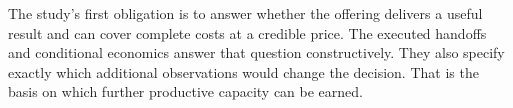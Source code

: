 The study's first obligation is to answer whether the offering delivers a useful result and can cover complete costs at a credible price. The executed handoffs and conditional economics answer that question constructively. They also specify exactly which additional observations would change the decision. That is the basis on which further productive capacity can be earned.
